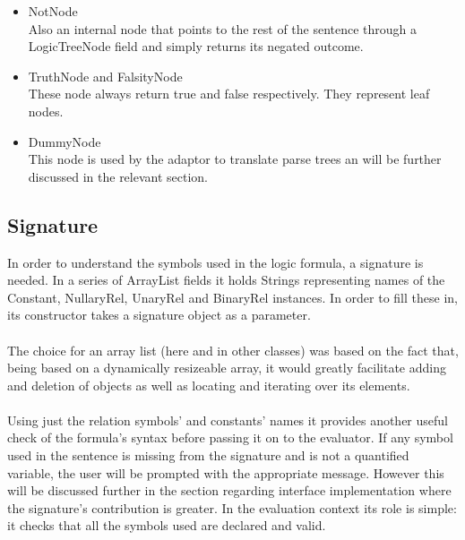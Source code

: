 \documentclass{report}
\begin{document}
\begin{itemize}
\item NotNode \\
Also an internal node that points to the rest of the sentence through a 
LogicTreeNode field and simply returns its negated outcome.

\item TruthNode and FalsityNode \\
These node always return true and false respectively. They represent leaf nodes.

\item DummyNode \\
This node is used by the adaptor to translate parse trees an will be further 
discussed in the relevant section.
\end{itemize}

\subsection{Signature}
In order to understand the symbols used in the logic formula, a signature is 
needed. In a series of ArrayList fields it holds Strings representing names of 
the Constant, NullaryRel, UnaryRel and BinaryRel instances. In order to fill 
these in, its constructor takes a signature object as a parameter.
\\ \\
The choice for an array list (here and in other classes) was based on the fact 
that, being based on a dynamically resizeable array, it would greatly facilitate 
adding and deletion of objects as well as locating and iterating over its 
elements. 
\\ \\
Using just the relation symbols' and constants' names it provides another useful 
check of the formula's syntax before passing it on to the evaluator. If any 
symbol used in the sentence is missing from the signature and is not a 
quantified variable, the user will be prompted with the appropriate message. 
However this will be discussed further in the section regarding interface 
implementation where the signature's contribution is greater. In the evaluation 
context its role is simple: it checks that all the symbols used are declared 
and valid.
\end{document}
